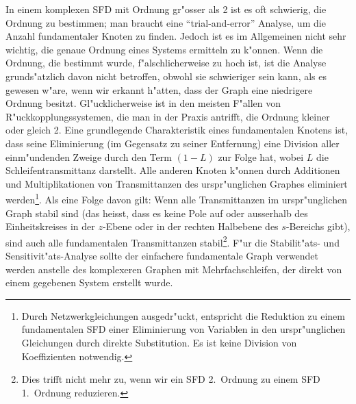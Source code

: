 \nit In einem komplexen SFD mit Ordnung gr"osser als 2 ist es oft
schwierig, die Ordnung zu bestimmen; man braucht eine
``trial-and-error'' Analyse, um die Anzahl fundamentaler Knoten zu
finden. Jedoch ist es im Allgemeinen nicht sehr wichtig, die genaue
Ordnung eines Systems ermitteln zu k"onnen. Wenn die Ordnung, die
bestimmt wurde, f"alschlicherweise zu hoch ist, ist die Analyse
grunds"atzlich davon nicht betroffen, obwohl sie schwieriger sein
kann, als es gewesen w"are, wenn wir erkannt h"atten, dass der Graph
eine niedrigere Ordnung besitzt. Gl"ucklicherweise ist in den meisten
F"allen von R"uckkopplungssystemen, die man in der Praxis antrifft,
die Ordnung kleiner oder gleich 2.  Eine grundlegende Charakteristik
eines fundamentalen Knotens ist, dass seine Eliminierung (im Gegensatz
zu seiner Entfernung) eine Division aller einm"undenden Zweige durch
den Term $(1-L)$ zur Folge hat, wobei $L$ die Schleifentransmittanz
darstellt. Alle anderen Knoten k"onnen durch Additionen und
Multiplikationen von Transmittanzen des urspr"unglichen Graphes
eliminiert werden\footnote{Durch Netzwerkgleichungen ausgedr"uckt,
  entspricht die Reduktion zu einem fundamentalen SFD einer
  Eliminierung von Variablen in den urspr"unglichen Gleichungen durch
  direkte Substitution. Es ist keine Division von Koeffizienten
  notwendig.}. Als eine Folge davon gilt: Wenn alle Transmittanzen im
urspr"unglichen Graph stabil sind (das heisst, dass es keine Pole auf
oder ausserhalb des Einheitskreises in der $z$-Ebene oder in der
rechten Halbebene des $s$-Bereichs gibt), sind auch alle fundamentalen
Transmittanzen stabil\footnote{Dies trifft nicht mehr zu, wenn wir ein
  SFD 2.~Ordnung zu einem SFD 1.~Ordnung
  reduzieren.}. F"ur die Stabilit"ats- und
Sensitivit"ats-Analyse sollte der einfachere
fundamentale Graph verwendet werden anstelle des komplexeren Graphen
mit Mehrfachschleifen, der direkt von einem gegebenen System erstellt
wurde.
